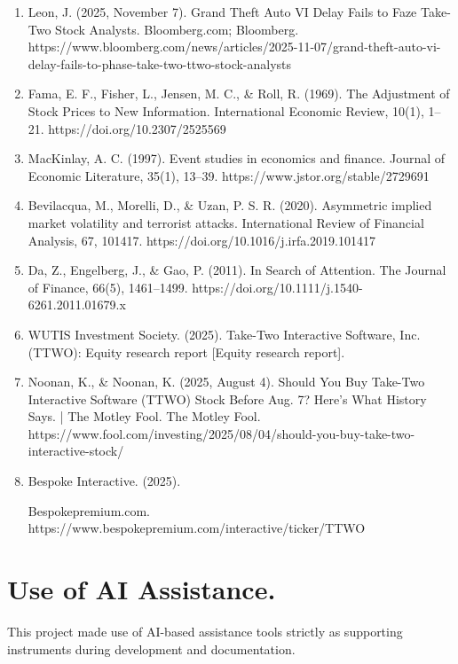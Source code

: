 \documentclass[11pt,a4paper]{article}
\begin{document}



\begin{enumerate}
    \item Leon, J. (2025, November 7). Grand Theft Auto VI Delay Fails to Faze Take-Two Stock Analysts. Bloomberg.com; Bloomberg. https://www.bloomberg.com/news/articles/2025-11-07/grand-theft-auto-vi-delay-fails-to-phase-take-two-ttwo-stock-analysts    
    \item Fama, E. F., Fisher, L., Jensen, M. C., \& Roll, R. (1969). The Adjustment of Stock Prices to New Information. International Economic Review, 10(1), 1–21. https://doi.org/10.2307/2525569
    \item MacKinlay, A. C. (1997). Event studies in economics and finance. Journal of Economic Literature, 35(1), 13–39. https://www.jstor.org/stable/2729691
    \item Bevilacqua, M., Morelli, D., \& Uzan, P. S. R. (2020). Asymmetric implied market volatility and terrorist attacks. International Review of Financial Analysis, 67, 101417. https://doi.org/10.1016/j.irfa.2019.101417
    \item Da, Z., Engelberg, J., \& Gao, P. (2011). In Search of Attention. The Journal of Finance, 66(5), 1461–1499. https://doi.org/10.1111/j.1540-6261.2011.01679.x 
    \item WUTIS Investment Society. (2025). Take-Two Interactive Software, Inc. (TTWO): Equity research report [Equity research report]. 
    \item Noonan, K., \& Noonan, K. (2025, August 4). Should You Buy Take-Two Interactive Software (TTWO) Stock Before Aug. 7? Here’s What History Says. | The Motley Fool. The Motley Fool. https://www.fool.com/investing/2025/08/04/should-you-buy-take-two-interactive-stock/
    \item Bespoke Interactive. (2025). 
    
    Bespokepremium.com. https://www.bespokepremium.com/interactive/ticker/TTWO

\end{enumerate}

\section*{Use of AI Assistance.}
This project made use of AI-based assistance tools strictly as supporting instruments during development and documentation.
\end{document}
